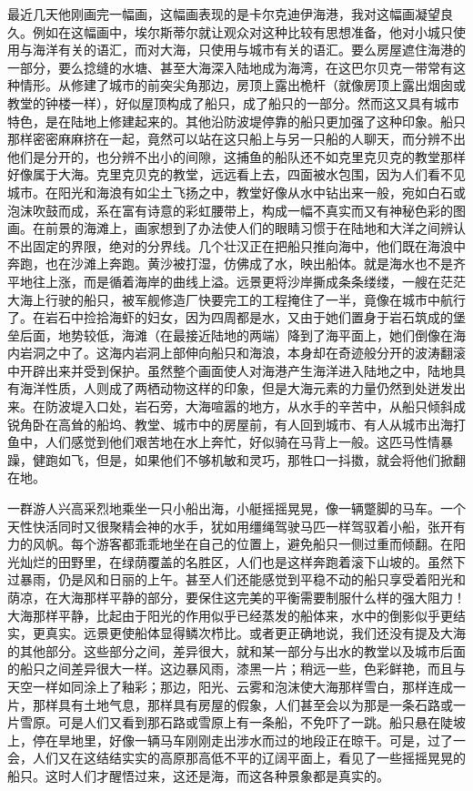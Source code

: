 \par 最近几天他刚画完一幅画，这幅画表现的是卡尔克迪伊海港，我对这幅画凝望良久。例如在这幅画中，埃尔斯蒂尔就让观众对这种比较有思想准备，他对小城只使用与海洋有关的语汇，而对大海，只使用与城市有关的语汇。要么房屋遮住海港的一部分，要么捻缝的水塘、甚至大海深入陆地成为海湾，在这巴尔贝克一带常有这种情形。从修建了城市的前突尖角那边，房顶上露出桅杆（就像房顶上露出烟囱或教堂的钟楼一样），好似屋顶构成了船只，成了船只的一部分。然而这又具有城市特色，是在陆地上修建起来的。其他沿防波堤停靠的船只更加强了这种印象。船只那样密密麻麻挤在一起，竟然可以站在这只船上与另一只船的人聊天，而分辨不出他们是分开的，也分辨不出小的间隙，这捕鱼的船队还不如克里克贝克的教堂那样好像属于大海。克里克贝克的教堂，远远看上去，四面被水包围，因为人们看不见城市。在阳光和海浪有如尘土飞扬之中，教堂好像从水中钻出来一般，宛如白石或泡沫吹鼓而成，系在富有诗意的彩虹腰带上，构成一幅不真实而又有神秘色彩的图画。在前景的海滩上，画家想到了办法使人们的眼睛习惯于在陆地和大洋之间辨认不出固定的界限，绝对的分界线。几个壮汉正在把船只推向海中，他们既在海浪中奔跑，也在沙滩上奔跑。黄沙被打湿，仿佛成了水，映出船体。就是海水也不是齐平地往上涨，而是循着海岸的曲线上溢。远景更将沙岸撕成条条缕缕，一艘在茫茫大海上行驶的船只，被军舰修造厂快要完工的工程掩住了一半，竟像在城市中航行了。在岩石中捡拾海虾的妇女，因为四周都是水，又由于她们置身于岩石筑成的堡垒后面，地势较低，海滩（在最接近陆地的两端）降到了海平面上，她们倒像在海内岩洞之中了。这海内岩洞上部伸向船只和海浪，本身却在奇迹般分开的波涛翻滚中开辟出来并受到保护。虽然整个画面使人对海港产生海洋进入陆地之中，陆地具有海洋性质，人则成了两栖动物这样的印象，但是大海元素的力量仍然到处迸发出来。在防波堤入口处，岩石旁，大海喧嚣的地方，从水手的辛苦中，从船只倾斜成锐角卧在高耸的船坞、教堂、城市中的房屋前，有人回到城市、有人从城市出海打鱼中，人们感觉到他们艰苦地在水上奔忙，好似骑在马背上一般。这匹马性情暴躁，健跑如飞，但是，如果他们不够机敏和灵巧，那牲口一抖擞，就会将他们掀翻在地。
\par 一群游人兴高采烈地乘坐一只小船出海，小艇摇摇晃晃，像一辆蹩脚的马车。一个天性快活同时又很聚精会神的水手，犹如用缰绳驾驶马匹一样驾驭着小船，张开有力的风帆。每个游客都乖乖地坐在自己的位置上，避免船只一侧过重而倾翻。在阳光灿烂的田野里，在绿荫覆盖的名胜区，人们也是这样奔跑着滚下山坡的。虽然下过暴雨，仍是风和日丽的上午。甚至人们还能感觉到平稳不动的船只享受着阳光和荫凉，在大海那样平静的部分，要保住这完美的平衡需要制服什么样的强大阻力！大海那样平静，比起由于阳光的作用似乎已经蒸发的船体来，水中的倒影似乎更结实，更真实。远景更使船体显得鳞次栉比。或者更正确地说，我们还没有提及大海的其他部分。这些部分之间，差异很大，就和某一部分与出水的教堂以及城市后面的船只之间差异很大一样。这边暴风雨，漆黑一片；稍远一些，色彩鲜艳，而且与天空一样如同涂上了釉彩；那边，阳光、云雾和泡沫使大海那样雪白，那样连成一片，那样具有土地气息，那样具有房屋的假象，人们甚至会以为那是一条石路或一片雪原。可是人们又看到那石路或雪原上有一条船，不免吓了一跳。船只悬在陡坡上，停在旱地里，好像一辆马车刚刚走出涉水而过的地段正在晾干。可是，过了一会，人们又在这结结实实的高原那高低不平的辽阔平面上，看见了一些摇摇晃晃的船只。这时人们才醒悟过来，这还是海，而这各种景象都是真实的。
